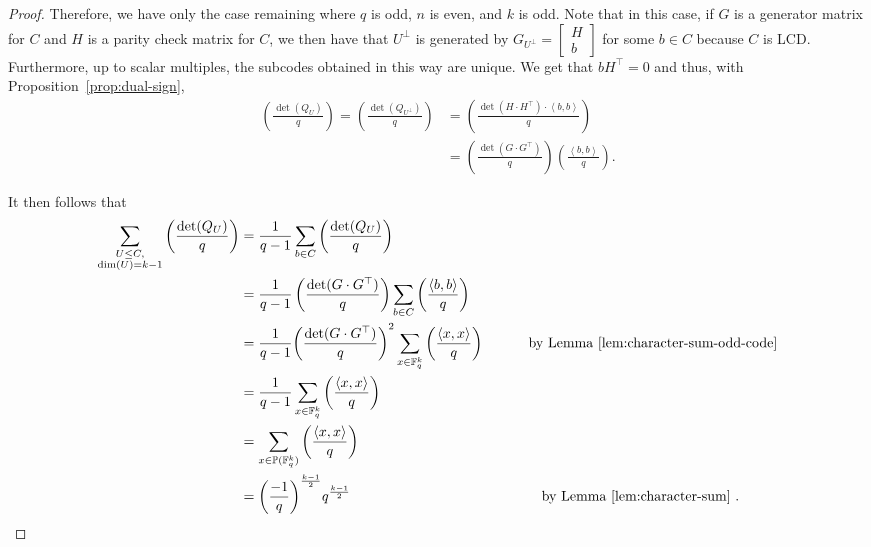 \documentclass[11pt]{article}
\theoremstyle{definition}
\newcommand{\F}{\mathbb{F}}
\newcommand{\Proj}{\mathbb{P}}
\newcommand{\Leg}[2]{\left(\frac{#1}{#2}\right)}                       %
\newcommand{\Ang}[1]{\left\langle#1\right\rangle}
\begin{document}
\begin{proof}
	Therefore, we have only the case remaining where $q$ is odd, $n$ is even, and $k$ is odd.
	Note that in this case, if $G$ is a generator matrix for $C$ and $H$ is a parity check matrix for $C$, we then have that $U^\perp$ is generated by $G_{U^\perp}=\begin{bmatrix} H \\ b \end{bmatrix}$ for some $b \in C$ because $C$ is LCD\@.
	Furthermore, up to scalar multiples, the subcodes obtained in this way are unique.
	We get that $bH^\top = 0$ and thus, with Proposition~\ref{prop:dual-sign}, 
	\begin{align*}
		\Leg{\det(Q_U)}{q}
		= \Leg{\det(Q_{U^\perp})}{q}
		&= \Leg{\det(H \cdot H^\top) \cdot \Ang{b, b}}{q} \\
		&= \Leg{\det(G \cdot G^\top)}{q} \Leg{\Ang{b, b}}{q}.
	\end{align*}

	It then follows that
	\begin{align*}
		\sum_{\substack{
			U \leq C, \\
			\dim(U) = k - 1
		}} \Leg{\det(Q_U)}{q}
		&= \frac{1}{q - 1} \sum_{b \in C} \Leg{\det(Q_U)}{q} \\
		&= \frac{1}{q - 1} \Leg{\det(G \cdot G^\top)}{q} \sum_{b \in C} \Leg{\Ang{b, b}}{q} \\
		&= \frac{1}{q - 1} {\Leg{\det(G \cdot G^\top)}{q}}^2
		\sum_{x \in \F_q^k} \Leg{\Ang{x, x}}{q} \hspace{1.1cm} \text{by Lemma~\ref{lem:character-sum-odd-code}}\\
		&= \frac{1}{q - 1} \sum_{x \in \F_q^k} \Leg{\Ang{x, x}}{q} \\
		&= \sum_{x \in \Proj(\F_q^k)} \Leg{\Ang{x, x}}{q} \\
		&= {\Leg{-1}{q}}^{\frac{k - 1}{2}} q^{\frac{k - 1}{2}}\hspace{4.8cm} \text{by Lemma~\ref{lem:character-sum} }.
	\end{align*}


\end{proof}
\end{document}
